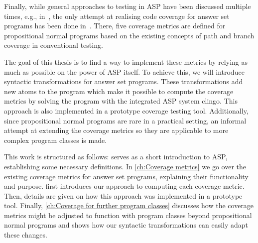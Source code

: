 Finally, while general approaches to testing in ASP have been discussed multiple times, e.g., in~\cite{GOT17, ABR21, Oet22}, the only attempt at realising code coverage for answer set programs has been done in~\cite{Jan+10}. 
There, five coverage metrics are defined for propositional normal programs based on the existing concepts of path and branch coverage in conventional testing. 

The goal of this thesis is to find a way to implement these metrics by relying as much as possible on the power of ASP itself. To achieve this, we will introduce syntactic transformations for answer set programs. These transformations add new atoms to the program which make it possible to compute the coverage metrics by solving the program with the integrated ASP system clingo. This approach is also implemented in a prototype coverage testing tool. Additionally, since propositional normal programs are rare in a practical setting, an informal attempt at extending the coverage metrics so they are applicable to more complex program classes is made.

This work is structured as follows:  serves as a short introduction to ASP, establishing some necessary definitions. In \cref{ch:Coverage metrics} we go over the existing coverage metrics for answer set programs, explaining their functionality and purpose.  first introduces our approach to computing each coverage metric. Then, details are given on how this approach was implemented in a prototype tool. Finally, \cref{ch:Coverage for further program classes} discusses how the coverage metrics might be adjusted to function with program classes beyond propositional normal programs and shows how our syntactic transformations can easily adapt these changes.

\begin{comment}
- Answer Set Programming is of growing importance in both academic and industry work (source?) and clingo is a popular solver for this

- Workflow Tools that make working with such programs easier and more comfortable barely exist. Research into these topics is only 
now getting more traction (source?)

- Testing is a very important part of a conventional software design approach.(source?)

- The topic of code coverage and it's use for conventional programming languages has been shown (source?)

- With this work I want to build on the previous work done on code coverage in answer set programming in this paper by~\textcite{Jan+10}

- To this end I developed a way to efficiently implement the coverage metrics defined in the paper.

- My implementation allows me to compute coverage using answer set programming. It also extends the given metrics to function with
almost all existing language construct instead of just for propositional programs.
\end{comment}

